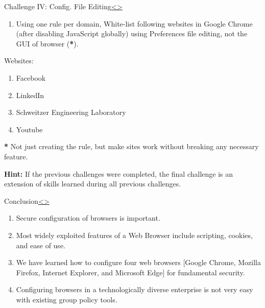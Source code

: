 \documentclass[12pt]{extarticle}
\newenvironment{instructionblock}{\Large\bgroup}{\egroup}
\begin{document}
	\pagebreak
	\begin{slide}{Challenge IV: Config. File Editing}{\hyperref[slide 19]{\textless}\hyperref[slide 21]{\textgreater}}
		\begin{instructionblock}
			\begin{enumerate}
				\item Using one rule per domain, White-list following websites in Google Chrome (after disabling JavaScript globally) using Preferences file editing, not the GUI of browser (\textbf{*}).
			\end{enumerate}
			Websites:
			\begin{enumerate}
				\item Facebook 
				\item LinkedIn 
				\item Schweitzer Engineering Laboratory
				\item Youtube
			\end{enumerate}
		\end{instructionblock}
	\end{slide}
	
	\vspace{2mm}
	\noindent
	\textbf{*} Not just creating the rule, but make sites work without breaking any necessary feature.
	
	\vspace{2mm}
	\noindent
	\textbf{Hint:} If the previous challenges were completed, the final challenge is an extension of skills learned during all previous challenges.
	

	
	 
	
	
	
	\pagebreak
	\begin{slide}{Conclusion}{\hyperref[slide 20]{\textless}\hyperref[slide 22]{\textgreater}}
		\begin{instructionblock}
			\begin{enumerate}
				\item Secure configuration of browsers is important.
				\item Most widely exploited features of a Web Browser include scripting, cookies, and ease of use.
				\item We have learned how to configure four web browsers [Google Chrome, Mozilla Firefox, Internet Explorer, and Microsoft Edge] for fundamental security.
				\item Configuring browsers in a technologically diverse enterprise is not very easy with existing group policy tools.
			\end{enumerate}
		\end{instructionblock}
	\end{slide}
	\vfill
	
\end{document}
